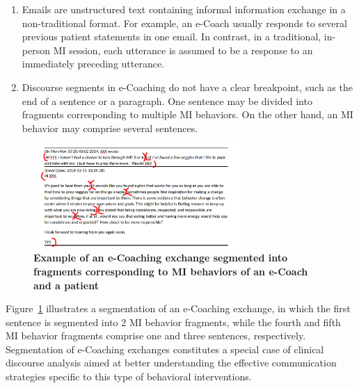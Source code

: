 \documentclass{amia}
\begin{document}
\begin{enumerate}
\item Emails are unstructured text containing informal information exchange in a non-traditional format. For example, an e-Coach usually responds to several previous patient statements in one email. In contrast, in a traditional, in-person MI session, each utterance is assumed to be a response to an immediately preceding utterance.
\item Discourse segments in e-Coaching do not have a clear breakpoint, such as the end of a sentence or a paragraph. One sentence may be divided into fragments corresponding to multiple MI behaviors. On the other hand, an MI behavior may comprise several sentences.
\end{enumerate}

\begin{figure}[!htb]
    \centering
    \includegraphics[width=0.7\textwidth]{figures/segment-example.png}
    \caption{\textbf{Example of an e-Coaching exchange segmented into fragments corresponding to MI behaviors of an e-Coach and a patient}}
    \label{fig:text-segment}
\end{figure}

Figure~\ref{fig:text-segment} illustrates a segmentation of an e-Coaching exchange, in which the first sentence is segmented into 2 MI behavior fragments, while the fourth and fifth MI behavior fragments comprise one and three sentences, respectively. Segmentation of e-Coaching exchanges constitutes a special case of clinical discourse analysis \cite{webber2012discourse} aimed at better understanding the effective communication strategies specific to this type of behavioral interventions. 
\end{document}

